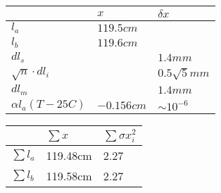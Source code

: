 \begin{tabular}{| l | l | l |}
\hline
 & $x$ & $\delta x$ \\
\hline
$l_a$                 & $119.5cm$ &    \\             
$l_b$                 & $119.6cm$ &    \\        
$dl_s$                &     & $1.4mm$   \\             
$\sqrt{n}\cdot dl_i$  &     & $0.5\sqrt{5}mm$   \\                  
$dl_m$                &     & $1.4mm$   \\                  
$\alpha l_a (T-25C)$  & $-0.156cm$ & $\sim 10^{-6}$   \\ 
\hline                

\end{tabular}

\begin{tabular}{| l | l | l |}
\hline
& $\sum x$ & $\sum \sigma x_i^2$ \\
\hline
$\sum l_a$ & 119.48cm & 2.27 \\
$\sum l_b$ & 119.58cm & 2.27 \\
\hline   
\end{tabular}